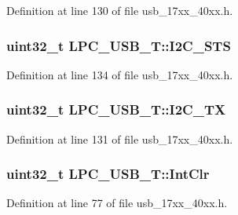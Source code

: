Definition at line 130 of file usb\+\_\+17xx\+\_\+40xx.\+h.

\subsubsection[{\texorpdfstring{I2\+C\+\_\+\+S\+TS}{I2C_STS}}]{ uint32\+\_\+t L\+P\+C\+\_\+\+U\+S\+B\+\_\+\+T\+::\+I2\+C\+\_\+\+S\+TS}\hypertarget{structLPC__USB__T_a0441cabc8a0f3d592e194783801d7e76}{}\label{structLPC__USB__T_a0441cabc8a0f3d592e194783801d7e76}


Definition at line 134 of file usb\+\_\+17xx\+\_\+40xx.\+h.

\subsubsection[{\texorpdfstring{I2\+C\+\_\+\+TX}{I2C_TX}}]{ uint32\+\_\+t L\+P\+C\+\_\+\+U\+S\+B\+\_\+\+T\+::\+I2\+C\+\_\+\+TX}\hypertarget{structLPC__USB__T_a540c83c79692087925a2775cc1230c68}{}\label{structLPC__USB__T_a540c83c79692087925a2775cc1230c68}


Definition at line 131 of file usb\+\_\+17xx\+\_\+40xx.\+h.

\subsubsection[{\texorpdfstring{Int\+Clr}{IntClr}}]{ uint32\+\_\+t L\+P\+C\+\_\+\+U\+S\+B\+\_\+\+T\+::\+Int\+Clr}\hypertarget{structLPC__USB__T_a62ff8d124ddb4f255acde62f498232f3}{}\label{structLPC__USB__T_a62ff8d124ddb4f255acde62f498232f3}


Definition at line 77 of file usb\+\_\+17xx\+\_\+40xx.\+h.

